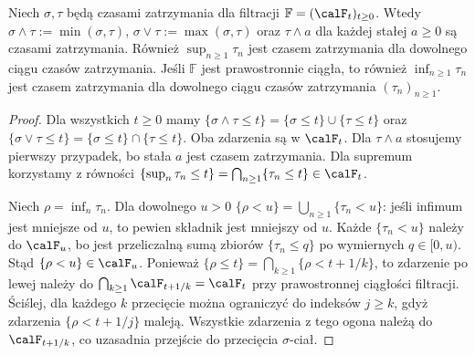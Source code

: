 \begin{stwierdzenie}
Niech $\sigma,\tau$ będą czasami zatrzymania dla filtracji
$\mathbb F=(\calF_t)_{t\ge0}$. Wtedy
$\sigma\wedge\tau:=\min(\sigma,\tau)$,
$\sigma\vee\tau:=\max(\sigma,\tau)$ oraz
$\tau\wedge a$ dla każdej stałej $a\ge0$ są czasami
zatrzymania. Również $\sup_{n\ge1}\tau_n$ jest czasem
zatrzymania dla dowolnego ciągu czasów zatrzymania.
Jeśli $\mathbb F$ jest prawostronnie ciągła,
to również $\inf_{n\ge1}\tau_n$ jest czasem zatrzymania
dla dowolnego ciągu czasów zatrzymania $(\tau_n)_{n\ge1}$.
\end{stwierdzenie}
\begin{proof}
Dla wszystkich $t\ge0$ mamy
$\{\sigma\wedge\tau\le t\}
=\{\sigma\le t\}\cup\{\tau\le t\}$ oraz
$\{\sigma\vee\tau\le t\}
=\{\sigma\le t\}\cap\{\tau\le t\}$.
Oba zdarzenia są w $\calF_t$.
Dla $\tau\wedge a$ stosujemy pierwszy przypadek,
bo stała $a$ jest czasem zatrzymania. Dla supremum
korzystamy z równości
$\{\sup_n\tau_n\le t\}=\bigcap_{n\ge1}\{\tau_n\le t\}\in\calF_t$.

Niech $\rho=\inf_n\tau_n$. Dla dowolnego $u>0$
$\{\rho<u\}=\bigcup_{n\ge1}\{\tau_n<u\}$:
jeśli infimum jest mniejsze od $u$, to pewien
składnik jest mniejszy od $u$.
Każde $\{\tau_n<u\}$ należy do $\calF_u$,
bo jest przeliczalną sumą zbiorów
$\{\tau_n\le q\}$ po wymiernych $q\in[0,u)$.
Stąd $\{\rho<u\}\in\calF_u$.
Ponieważ
$\{\rho\le t\}=\bigcap_{k\ge1}\{\rho<t+1/k\}$,
to zdarzenie po lewej należy do
$\bigcap_{k\ge1}\calF_{t+1/k}=\calF_t$
przy prawostronnej ciągłości filtracji. Ściślej, dla
każdego $k$ przecięcie można ograniczyć do indeksów
$j\ge k$, gdyż zdarzenia $\{\rho<t+1/j\}$ maleją.
Wszystkie zdarzenia z tego ogona należą do
$\calF_{t+1/k}$, co uzasadnia przejście do przecięcia
$\sigma$-ciał.
\end{proof}

